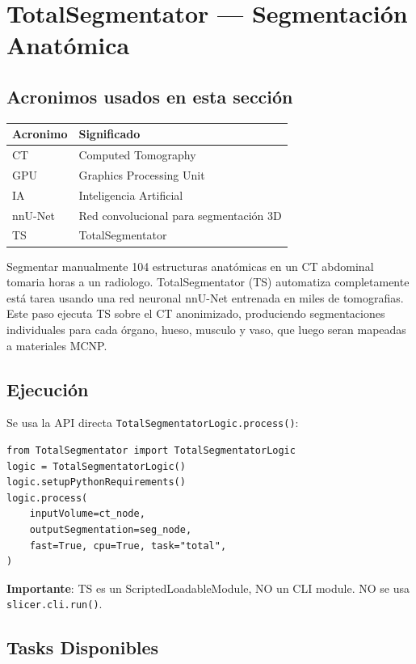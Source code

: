 \documentclass[12pt,a4paper]{article}
\begin{document}
\section{TotalSegmentator --- Segmentación Anatómica}
\label{sec:ts}

\subsection*{Acronimos usados en esta sección}
\begin{tabular}{ll}
\toprule
\textbf{Acronimo} & \textbf{Significado} \\
\midrule
CT & Computed Tomography \\
GPU & Graphics Processing Unit \\
IA & Inteligencia Artificial \\
nnU-Net & Red convolucional para segmentación 3D \\
TS & TotalSegmentator \\
\bottomrule
\end{tabular}

Segmentar manualmente 104 estructuras anatómicas en un CT abdominal tomaria horas a un radiologo.
TotalSegmentator (TS) automatiza completamente está tarea usando una red neuronal nnU-Net
entrenada en miles de tomografias. Este paso ejecuta TS sobre el CT anonimizado, produciendo
segmentaciones individuales para cada órgano, hueso, musculo y vaso, que luego seran mapeadas
a materiales MCNP.

\subsection{Ejecución}

Se usa la API directa \texttt{TotalSegmentatorLogic.process()}:

\begin{lstlisting}
from TotalSegmentator import TotalSegmentatorLogic
logic = TotalSegmentatorLogic()
logic.setupPythonRequirements()
logic.process(
    inputVolume=ct_node,
    outputSegmentation=seg_node,
    fast=True, cpu=True, task="total",
)
\end{lstlisting}

\textbf{Importante}: TS es un ScriptedLoadableModule, NO un CLI module.
NO se usa \texttt{slicer.cli.run()}.

\subsection{Tasks Disponibles}
\end{document}
